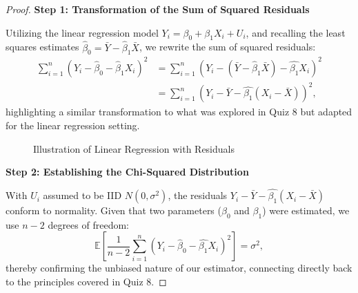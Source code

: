 \documentclass[12pt]{amsart}
\theoremstyle{definition}
\numberwithin{equation}{section}
\theoremstyle{plain}
\begin{document}
\begin{proof}

\textbf{\large Step 1: Transformation of the Sum of Squared Residuals}

Utilizing the linear regression model \(Y_i = \beta_0 + \beta_1X_i + U_i\), and recalling the least squares estimates \(\widehat{\beta}_0 = \bar{Y} - \widehat{\beta}_1 \bar{X}\), we rewrite the sum of squared residuals:
\begin{align*}
\sum_{i=1}^n(Y_i - \widehat{\beta}_0 - \widehat{\beta}_1X_i)^2 &= \sum_{i=1}^n(Y_i - (\bar{Y} - \widehat{\beta}_1\bar{X}) - \widehat{\beta_1}X_i)^2 \\
&= \sum_{i=1}^n(Y_i - \bar{Y} - \widehat{\beta_1}(X_i - \bar{X}))^2,
\end{align*}
highlighting a similar transformation to what was explored in Quiz 8 but adapted for the linear regression setting.

\begin{figure*}[ht]
    \centering
    \caption{Illustration of Linear Regression with Residuals}
\end{figure*}
\newpage
\textbf{\large Step 2: Establishing the Chi-Squared Distribution}

With \(U_i\) assumed to be IID \(N(0, \sigma^2)\), the residuals \(Y_i - \bar{Y} - \widehat{\beta_1}(X_i - \bar{X})\) conform to normality. Given that two parameters (\(\beta_0\) and \(\beta_1\)) were estimated, we use \(n-2\) degrees of freedom:
\[
\mathbb{E}\left[\frac{1}{n-2}\sum_{i=1}^n(Y_i - \widehat{\beta}_0 - \widehat{\beta_1}X_i)^2\right] = \sigma^2,
\]
thereby confirming the unbiased nature of our estimator, connecting directly back to the principles covered in Quiz 8.


\end{proof}
\end{document}
